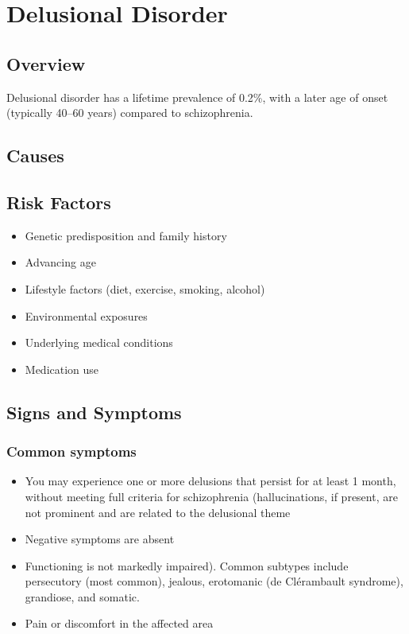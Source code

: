 \chapter{Delusional Disorder}
\label{sec:Delusional Disorder}

\section{Overview}
Delusional disorder has a lifetime prevalence of 0.2\%, with a later age of onset (typically 40--60 years) compared to schizophrenia.
\section{Causes}
\section{Risk Factors}

\begin{itemize}[noitemsep]
  \item Genetic predisposition and family history
  \item Advancing age
  \item Lifestyle factors (diet, exercise, smoking, alcohol)
  \item Environmental exposures
  \item Underlying medical conditions
  \item Medication use
\end{itemize}
\section{Signs and Symptoms}

\subsection{Common symptoms}
\begin{itemize}[noitemsep]
  \item You may experience one or more delusions that persist for at least 1 month, without meeting full criteria for schizophrenia (hallucinations, if present, are not prominent and are related to the delusional theme
  \item Negative symptoms are absent
  \item Functioning is not markedly impaired). Common subtypes include persecutory (most common), jealous, erotomanic (de Clérambault syndrome), grandiose, and somatic.
  \item Pain or discomfort in the affected area
  \end{itemize}

